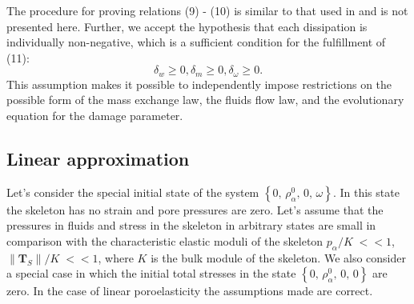 \documentclass[article,authoryear,jpm]{beg_39}             %
\begin{document}
The procedure for proving relations (9) - (10) is similar to that used in \cite{Truesdell, Kondaurov2007} and is not presented here. Further, we accept the hypothesis that each dissipation is individually non-negative, which is a sufficient condition for the fulfillment of (11):
\begin{equation}
{{\delta }_{w}}\ge 0, {{\delta }_{m}}\ge 0, {{\delta }_{\omega }}\ge 0.
\end{equation}
This assumption makes it possible to independently impose restrictions on the possible form of the mass exchange law, the fluids flow law, and the evolutionary equation for the damage parameter.
\subsection{Linear approximation}
Let’s consider the special initial state of the system
$\left\{ 0,\,\rho _{\alpha }^{0},\,0,\,\omega \right\}$.
In this state the skeleton has no strain and pore pressures are zero. Let’s assume that the pressures in fluids and stress in the skeleton in arbitrary states are small in comparison with the characteristic elastic moduli of the skeleton
${{{p}_{\alpha }}}/{K}\;<<1$, ${\left\| {{\mathbf{T}}_{S}} \right\|}/{K}\;<<1$,
where $K$ is the bulk module of the skeleton. We also consider a special case in which the initial total stresses in the state
$\left\{ 0,\,\rho _{\alpha }^{0},\,0,\,0 \right\}$
are zero. In the case of linear poroelasticity the assumptions made are correct.
\end{document}
